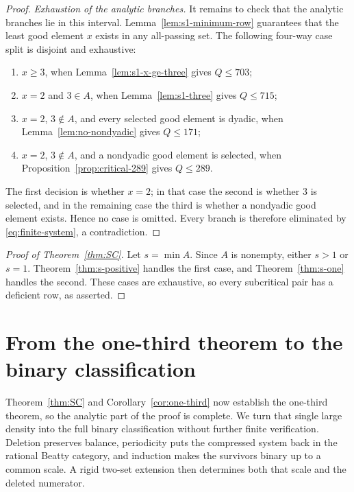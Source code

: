 \documentclass[11pt]{article}
\theoremstyle{definition}
\theoremstyle{remark}
\begin{document}
\begin{proof}
\smallskip
\noindent\emph{Exhaustion of the analytic branches.}
It remains to check that the analytic branches lie in this interval.
Lemma~\ref{lem:s1-minimum-row} guarantees that the least good element \(x\)
exists in any all-passing set.  The following four-way case split is
disjoint and exhaustive:
\begin{enumerate}[label=\textup{(\alph*)},leftmargin=2.2em]
\item \(x\ge3\), when Lemma~\ref{lem:s1-x-ge-three} gives \(Q\le703\);
\item \(x=2\) and \(3\in A\), when Lemma~\ref{lem:s1-three} gives
\(Q\le715\);
\item \(x=2\), \(3\notin A\), and every selected good element is dyadic,
when Lemma~\ref{lem:no-nondyadic} gives \(Q\le171\);
\item \(x=2\), \(3\notin A\), and a nondyadic good element is selected,
when Proposition~\ref{prop:critical-289} gives \(Q\le289\).
\end{enumerate}
The first decision is whether \(x=2\); in that case the second is whether
\(3\) is selected, and in the remaining case the third is whether a
nondyadic good element exists.  Hence no case is omitted.  Every branch is
therefore eliminated by
\eqref{eq:finite-system}, a contradiction.
\end{proof}

\begin{proof}[Proof of Theorem~\ref{thm:SC}]
Let \(s=\min A\).  Since \(A\) is nonempty, either \(s>1\) or \(s=1\).
Theorem~\ref{thm:s-positive} handles the first case, and
Theorem~\ref{thm:s-one} handles the second.  These cases are exhaustive, so
every subcritical pair has a deficient row, as asserted.
\end{proof}

\section{From the one-third theorem to the binary classification}
\label{sec:induction}

Theorem~\ref{thm:SC} and Corollary~\ref{cor:one-third} now establish the
one-third theorem, so the analytic part of the proof is complete.  We turn
that single large density into the full binary classification without further
finite verification.  Deletion preserves balance, periodicity puts the
compressed system back in the rational Beatty category, and induction makes
the survivors binary up to a common scale.  A rigid two-set extension then
determines both that scale and the deleted numerator.
\end{document}
